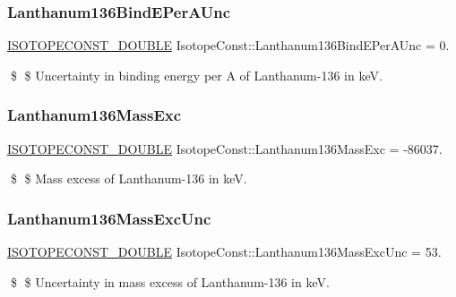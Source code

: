 \subsubsection{\texorpdfstring{Lanthanum136\+Bind\+E\+Per\+A\+Unc}{Lanthanum136BindEPerAUnc}}
{\footnotesize\ttfamily \mbox{\hyperlink{group___isotope_const-_macros_ga8f45a7272ce02c0b4c65c44636ed719a}{I\+S\+O\+T\+O\+P\+E\+C\+O\+N\+S\+T\+\_\+\+D\+O\+U\+B\+LE}} Isotope\+Const\+::\+Lanthanum136\+Bind\+E\+Per\+A\+Unc = 0.}

\$ \$ Uncertainty in binding energy per A of Lanthanum-\/136 in keV. \mbox{\label{group___isotope_const-_lanthanum-_la136_ga87dfc8e845eb5d805f3305408940f5b5}} 
\subsubsection{\texorpdfstring{Lanthanum136\+Mass\+Exc}{Lanthanum136MassExc}}
{\footnotesize\ttfamily \mbox{\hyperlink{group___isotope_const-_macros_ga8f45a7272ce02c0b4c65c44636ed719a}{I\+S\+O\+T\+O\+P\+E\+C\+O\+N\+S\+T\+\_\+\+D\+O\+U\+B\+LE}} Isotope\+Const\+::\+Lanthanum136\+Mass\+Exc = -\/86037.}

\$ \$ Mass excess of Lanthanum-\/136 in keV. \mbox{\label{group___isotope_const-_lanthanum-_la136_ga11b6186723576c4c11c03351689aae00}} 
\subsubsection{\texorpdfstring{Lanthanum136\+Mass\+Exc\+Unc}{Lanthanum136MassExcUnc}}
{\footnotesize\ttfamily \mbox{\hyperlink{group___isotope_const-_macros_ga8f45a7272ce02c0b4c65c44636ed719a}{I\+S\+O\+T\+O\+P\+E\+C\+O\+N\+S\+T\+\_\+\+D\+O\+U\+B\+LE}} Isotope\+Const\+::\+Lanthanum136\+Mass\+Exc\+Unc = 53.}

\$ \$ Uncertainty in mass excess of Lanthanum-\/136 in keV. \mbox{\label{group___isotope_const-_lanthanum-_la136_ga98da42457a63575a96bf86f9a6e95060}} 
